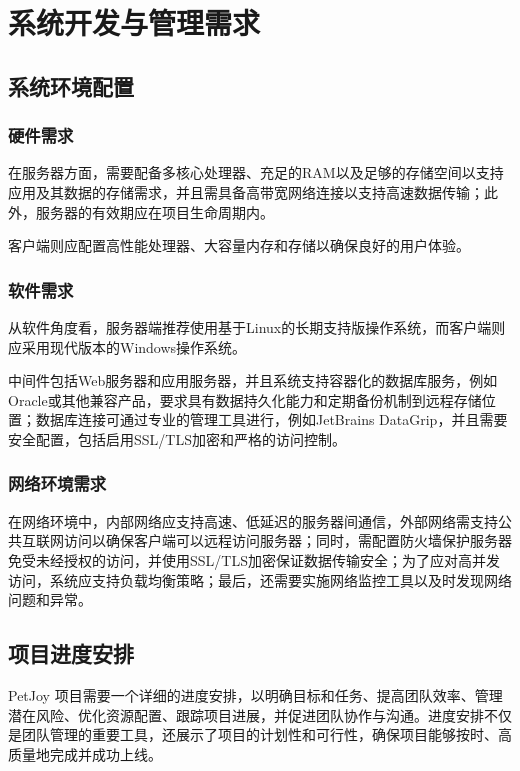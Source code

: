 \section{系统开发与管理需求}\label{sec:System_Development_and_Management_Requirements}

\subsection{系统环境配置}

\subsubsection{硬件需求}
在服务器方面，需要配备多核心处理器、充足的RAM以及足够的存储空间以支持应用及其数据的存储需求，并且需具备高带宽网络连接以支持高速数据传输；此外，服务器的有效期应在项目生命周期内。

客户端则应配置高性能处理器、大容量内存和存储以确保良好的用户体验。

\subsubsection{软件需求}
从软件角度看，服务器端推荐使用基于Linux的长期支持版操作系统，而客户端则应采用现代版本的Windows操作系统。

中间件包括Web服务器和应用服务器，并且系统支持容器化的数据库服务，例如Oracle或其他兼容产品，要求具有数据持久化能力和定期备份机制到远程存储位置；数据库连接可通过专业的管理工具进行，例如JetBrains DataGrip，并且需要安全配置，包括启用SSL/TLS加密和严格的访问控制。

\subsubsection{网络环境需求}
在网络环境中，内部网络应支持高速、低延迟的服务器间通信，外部网络需支持公共互联网访问以确保客户端可以远程访问服务器；同时，需配置防火墙保护服务器免受未经授权的访问，并使用SSL/TLS加密保证数据传输安全；为了应对高并发访问，系统应支持负载均衡策略；最后，还需要实施网络监控工具以及时发现网络问题和异常。

\subsection{项目进度安排}

PetJoy 项目需要一个详细的进度安排，以明确目标和任务、提高团队效率、管理潜在风险、优化资源配置、跟踪项目进展，并促进团队协作与沟通。进度安排不仅是团队管理的重要工具，还展示了项目的计划性和可行性，确保项目能够按时、高质量地完成并成功上线。

